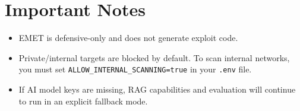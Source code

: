 \documentclass{article}
\begin{document}
\section*{Important Notes}
\begin{itemize}
    \item EMET is defensive-only and does not generate exploit code.
    \item Private/internal targets are blocked by default. To scan internal networks, you must set \texttt{ALLOW\_INTERNAL\_SCANNING=true} in your \texttt{.env} file.
    \item If AI model keys are missing, RAG capabilities and evaluation will continue to run in an explicit fallback mode.
\end{itemize}
\end{document}
